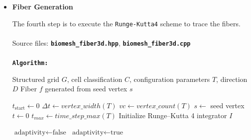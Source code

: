 \documentclass[11pt,a4paper]{article}
\begin{document}
\begin{itemize}
\begin{algorithmic}[1]
    \State $S \gets \emptyset$ 
    \State $A \gets \emptyset$ 
    \State $TotalArea \gets 0$

        \State $TotalArea \gets TotalArea + \text{Area}(t)$
        \State $A \gets A \cup \{TotalArea\}$
    \EndFor

    \State Initialize random number generator $R$

        \State $r \gets$ random value from $R$ scaled by $TotalArea$
        \State Find triangle $t \in P$ corresponding to index $r$ in $A$
        
        \State $u \gets$ random value from $R$  
        \State $v \gets$ random value from $R$
        \State $w \gets 1 - u - v$
        
        \State Let $p_0, p_1, p_2$ be vertices of triangle $t$
        \State $seed \gets w \cdot p_0 + u \cdot p_1 + v \cdot p_2$
        
        \State $S \gets S \cup \{seed\}$ 
    \EndFor
\end{algorithmic}

\item \textbf{Fiber Generation}

    The fourth step is to execute the \texttt{Runge-Kutta4} scheme to trace the fibers. \\
    \\
    Source files: \texttt{\textbf{biomesh\_fiber3d.hpp}}, \texttt{\textbf{biomesh\_fiber3d.cpp}}\\
    \\
    \texttt{\textbf{Algorithm:}}
\begin{algorithmic}[1]
    \Require Structured grid $G$, cell classification $C$, configuration parameters $T$, direction $D$
    \Ensure Fiber $f$ generated from seed vertex $s$

    \State $t_{\text{start}} \gets 0$
    \State $\Delta t \gets vertex\_width(T)$
    \State $vc \gets vertex\_count(T)$
    \State $s \gets$ seed vertex
    \State $t \gets 0$
    \State $t_{max} \gets time\_step\_max(T)$
    \State Initialize Runge--Kutta 4 integrator $I$

        \State $\text{adaptivity} \gets \text{false}$
        \State $\text{adaptivity} \gets \text{true}$
    \EndIf


\end{algorithmic}
\end{itemize}
\end{document}
